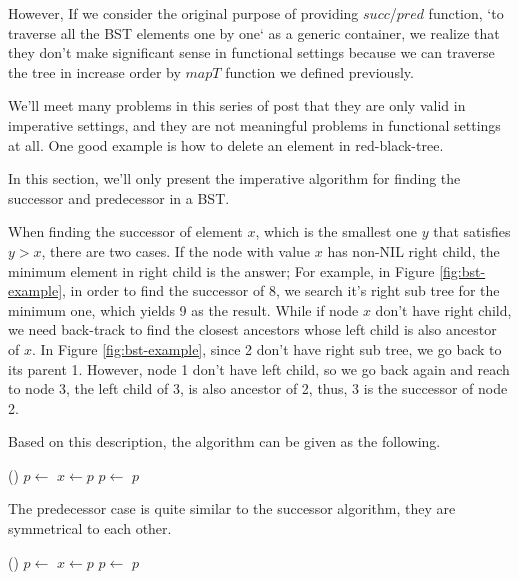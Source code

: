 \documentclass[UTF8]{article}
\begin{document}
However, If we consider
the original purpose of providing $succ$/$pred$ function, `to traverse all the
BST elements one by one` as a generic container, we realize
that they don't make significant sense in functional settings because
we can traverse the tree in increase order by $mapT$ function we defined
previously.

We'll meet many problems in this series of post that they are only valid
in imperative settings, and they are not meaningful problems in functional
settings at all. One good example is how to delete an element in
red-black-tree\cite{okasaki-blog}.

In this section, we'll only present the imperative algorithm for finding
the successor and predecessor in a BST.

When finding the successor of element $x$, which is the smallest one $y$
that satisfies $y > x$, there are two cases. If the node with value $x$
has non-NIL right child, the minimum element in right child is the answer;
For example, in Figure \ref{fig:bst-example}, in order to find the successor
of 8, we search it's right sub tree for the minimum one, which yields 9
as the result. While if node $x$ don't have right child, we need
back-track to find the closest ancestors whose left child is also ancestor
of $x$. In Figure \ref{fig:bst-example}, since 2 don't have right sub tree,
we go back to its parent 1. However, node 1 don't have left child, so we
go back again and reach to node 3, the left child of 3, is also ancestor
of 2, thus, 3 is the successor of node 2.

Based on this description, the algorithm can be given as the following.

\begin{algorithmic}[1]
    \State \Return {}()
  \Else
    \State $p \gets $ 
      \State $x \gets p$
      \State $p \gets $ 
    \EndWhile
    \State \Return $p$
  \EndIf
\EndFunction
\end{algorithmic}

The predecessor case is quite similar to the successor algorithm, they
are symmetrical to each other.

\begin{algorithmic}[1]
    \State \Return {}()
  \Else
    \State $p \gets $ 
      \State $x \gets p$
      \State $p \gets $ 
    \EndWhile
    \State \Return $p$
  \EndIf
\EndFunction
\end{algorithmic}
\end{document}
